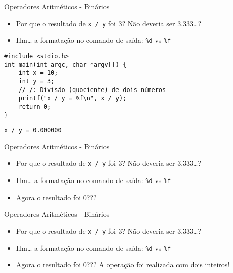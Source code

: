 \documentclass[t, aspectratio=169]{beamer}
\begin{document}
\begin{frame}[label={sec:orgf43269c},fragile]{Operadores Aritméticos - Binários}
 \begin{itemize}
\item Por que o resultado de \texttt{x / y} foi 3? Não deveria ser 3.333\ldots{}?
\item Hm\ldots{} a formatação no comando de saída: \texttt{\%d} vs \texttt{\%f}
\end{itemize}

\begin{verbatim}
#include <stdio.h>
int main(int argc, char *argv[]) {
    int x = 10;
    int y = 3;
    // /: Divisão (quociente) de dois números
    printf("x / y = %f\n", x / y);
    return 0;
}
\end{verbatim}

\begin{verbatim}
x / y = 0.000000
\end{verbatim}
\end{frame}

\begin{frame}[label={sec:org354f032},fragile]{Operadores Aritméticos - Binários}
 \begin{itemize}
\item Por que o resultado de \texttt{x / y} foi 3? Não deveria ser 3.333\ldots{}?
\item Hm\ldots{} a formatação no comando de saída: \texttt{\%d} vs \texttt{\%f}
\item Agora o resultado foi 0???
\end{itemize}
\end{frame}

\begin{frame}[label={sec:orge54773b},fragile]{Operadores Aritméticos - Binários}
 \begin{itemize}
\item Por que o resultado de \texttt{x / y} foi 3? Não deveria ser 3.333\ldots{}?
\item Hm\ldots{} a formatação no comando de saída: \texttt{\%d} vs \texttt{\%f}
\item Agora o resultado foi 0??? A operação foi realizada com dois \alert{inteiros!}
\end{itemize}
\end{frame}
\end{document}
